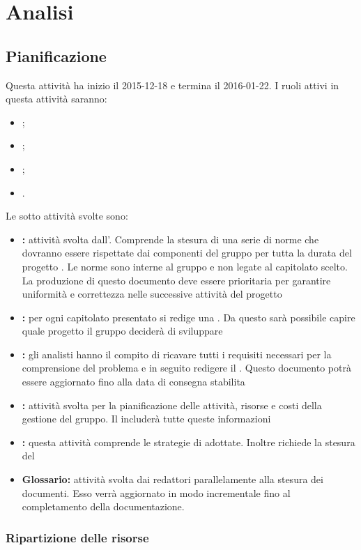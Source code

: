 \documentclass[12pt,a4paper]{article}
\begin{document}
\section{Analisi}
\subsection{Pianificazione} %
Questa attività ha inizio il 2015-12-18 e termina il 2016-01-22. I ruoli attivi in questa attività saranno:
\begin{itemize}
	\item \PM;
	\item \AM;
	\item \AN;
	\item \VR.
\end{itemize}
Le sotto attività svolte sono:
\begin{itemize}
	\item \textbf{\NdP:} attività svolta dall’\AM. Comprende la stesura di una serie di norme che dovranno essere rispettate dai componenti del gruppo per tutta la durata del progetto \prjL. Le norme sono interne al gruppo e non legate al capitolato scelto. La produzione di questo documento deve essere prioritaria per garantire uniformità e correttezza nelle successive attività del progetto
	\item \textbf{\SdF:} per ogni capitolato presentato si redige una \SdF. Da questo sarà possibile capire quale progetto il gruppo deciderà di sviluppare
	\item \textbf{\AdR:} gli analisti hanno il compito di ricavare tutti i requisiti necessari per la comprensione del problema e in seguito redigere il \AdR. Questo documento potrà essere aggiornato fino alla data di consegna stabilita
	\item \textbf{\PdP:} attività svolta per la pianificazione delle attività, risorse e costi della gestione del gruppo. Il \PdP{} includerà tutte queste informazioni
	\item \textbf{\PdQ:} questa attività comprende le strategie di \FVV adottate. Inoltre richiede la stesura del \PdQ
	\item \textbf{Glossario:} attività svolta dai redattori parallelamente alla stesura dei documenti. Esso verrà aggiornato in modo incrementale fino al completamento della documentazione.
\end{itemize}

\subsubsection{Ripartizione delle risorse}
\end{document}
